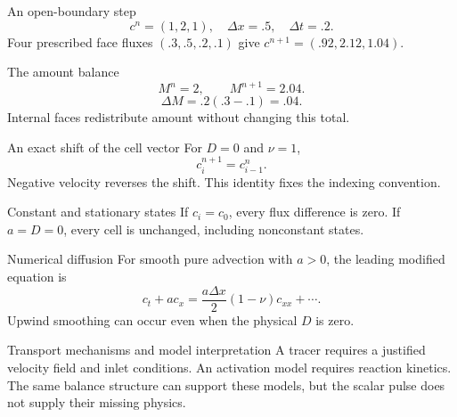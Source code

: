 \documentclass[aspectratio=169,11pt]{beamer}
\newcommand{\notestarget}{notes.pdf}\newcommand{\noteslabel}{Notes}
\begin{document}
\renewcommand{\notestarget}{notes.pdf\#note-an-open-boundary-calculation}
\begin{frame}[t,fragile,label=slide-an-open-boundary-step]{An open-boundary step}
\[c^n=(1,2,1),\quad \Delta x=.5,\quad\Delta t=.2.\]\pause{} Four prescribed face fluxes $(.3,.5,.2,.1)$ give $c^{n+1}=(.92,2.12,1.04)$.
\end{frame}
\renewcommand{\notestarget}{notes.pdf\#note-an-open-boundary-calculation}
\begin{frame}[t,fragile,label=slide-the-amount-balance]{The amount balance}
\[M^n=2,\qquad M^{n+1}=2.04.\]\pause{}\[\Delta M=.2(.3-.1)=.04.\] Internal faces redistribute amount without changing this total.
\end{frame}
\renewcommand{\notestarget}{notes.pdf\#note-periodic-transport-and-limiting-cases}
\begin{frame}[t,fragile,label=slide-an-exact-shift-of-the-cell-vector]{An exact shift of the cell vector}
For $D=0$ and $\nu=1$,\[c_i^{n+1}=c_{i-1}^n.\]\pause{} Negative velocity reverses the shift. This identity fixes the indexing convention.
\end{frame}
\renewcommand{\notestarget}{notes.pdf\#note-periodic-transport-and-limiting-cases}
\begin{frame}[t,fragile,label=slide-constant-and-stationary-states]{Constant and stationary states}
If $c_i=c_0$, every flux difference is zero.\pause{} If $a=D=0$, every cell is unchanged, including nonconstant states.
\end{frame}
\renewcommand{\notestarget}{notes.pdf\#note-physical-and-numerical-diffusion}
\begin{frame}[t,fragile,label=slide-numerical-diffusion]{Numerical diffusion}
For smooth pure advection with $a>0$, the leading modified equation is\[c_t+ac_x=\frac{a\Delta x}{2}(1-\nu)c_{xx}+\cdots.\]\pause{} Upwind smoothing can occur even when the physical $D$ is zero.
\end{frame}
\renewcommand{\notestarget}{notes.pdf\#note-physical-and-numerical-diffusion}
\begin{frame}[t,fragile,label=slide-transport-mechanisms-and-model-interpretation]{Transport mechanisms and model interpretation}
A tracer requires a justified velocity field and inlet conditions. An activation model requires reaction kinetics.\pause{} The same balance structure can support these models, but the scalar pulse does not supply their missing physics.
\end{frame}
\end{document}

